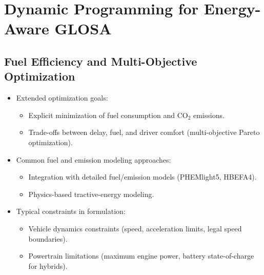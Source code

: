 \section{Dynamic Programming for Energy-Aware GLOSA}
\label{sec:eco_glosa}

\subsection{Fuel Efficiency and Multi-Objective Optimization}
\label{subsec:eco_dp_objectives}
\begin{itemize}
    \item Extended optimization goals:
    \begin{itemize}
        \item Explicit minimization of fuel consumption and CO$_2$ emissions.
        \item Trade-offs between delay, fuel, and driver comfort (multi-objective Pareto optimization).
    \end{itemize}
    \item Common fuel and emission modeling approaches:
    \begin{itemize}
        \item Integration with detailed fuel/emission models (PHEMlight5, HBEFA4).
        \item Physics-based tractive-energy modeling.
    \end{itemize}
    \item Typical constraints in formulation:
    \begin{itemize}
        \item Vehicle dynamics constraints (speed, acceleration limits, legal speed boundaries).
        \item Powertrain limitations (maximum engine power, battery state-of-charge for hybrids).
    \end{itemize}
\end{itemize}

